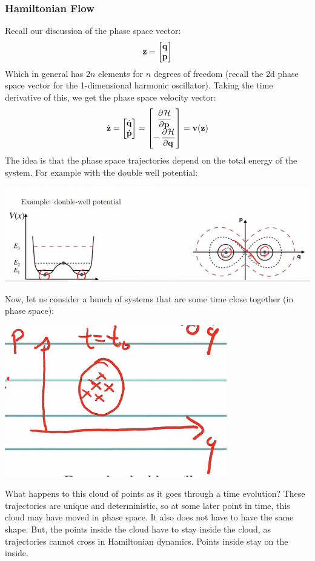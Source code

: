 \subsubsection{Hamiltonian Flow}
Recall our discussion of the phase space vector:
\[\mathbf{z} = \begin{bmatrix}\mathbf{q} \\ \mathbf{p}\end{bmatrix}\]
Which in general has $2n$ elements for $n$ degrees of freedom (recall the 2d phase space vector for the 1-dimensional harmonic oscillator). Taking the time derivative of this, we get the phase space velocity vector:
\[\dot{\v{z}} = \m{\dot{\v{q}} \\ \dot{\v{p}}} = \m{\dpd{\HH}{\v{p}} \\ -\dpd{\HH}{\v{q}}} = \v{v}(\v{z})\]
The idea is that the phase space trajectories depend on the total energy of the system. For example with the double well potential:
\begin{center}
    \includegraphics[scale=0.8]{Lecture-25/l25-img1.png}
\end{center}
Now, let us consider a bunch of systems that are some time close together (in phase space):
\begin{center}
    \includegraphics[scale=0.8]{Lecture-25/l25-img2.png}
\end{center}
What happens to this cloud of points as it goes through a time evolution? These trajectories are unique and deterministic, so at some later point in time, this cloud may have moved in phase space. It also does not have to have the same shape. But, the points inside the cloud have to stay inside the cloud, as trajectories cannot cross in Hamiltonian dynamics. Points inside stay on the inside.
